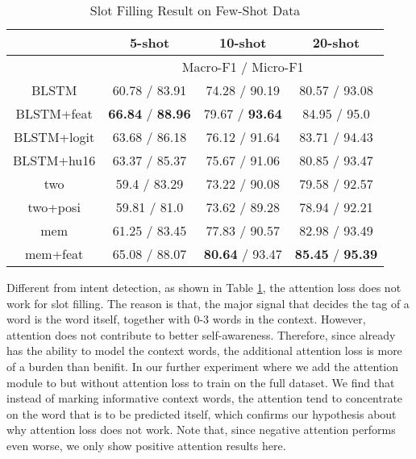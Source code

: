 \begin{table}
\setlength{\tabcolsep}{0.23em}
\centering
\small{
\begin{tabular}{|c|c|c|c|}

\hline
  & \multicolumn{1}{|c|}{5-shot} & \multicolumn{1}{|c|}{10-shot} & \multicolumn{1}{|c|}{20-shot}  \\
 \hline
  &  \multicolumn{3}{|c|}{Macro-F1 / Micro-F1}   \\
\hline
BLSTM & 60.78 / 83.91 & 74.28  / 90.19 & 80.57 / 93.08 \\
\hline
BLSTM+feat & \textbf{66.84} / \textbf{88.96} & 79.67 / \textbf{93.64} & 84.95 / 95.0 \\
\hline
BLSTM+logit & 63.68 / 86.18 & 76.12 / 91.64  & 83.71 / 94.43 \\
\hline
BLSTM+hu16 & 63.37 / 85.37 & 75.67 / 91.06 & 80.85 / 93.47 \\
\hline
two & 59.4 / 83.29 & 73.22 / 90.08 & 79.58 / 92.57 \\
\hline
two+posi & 59.81 / 81.0 & 73.62 / 89.28 & 78.94 / 92.21 \\
\hline
mem & 61.25 / 83.45 & 77.83 / 90.57 & 82.98 / 93.49 \\
\hline
mem+feat & 65.08 / 88.07 & \textbf{80.64} / 93.47 & \textbf{85.45} / \textbf{95.39} \\
\hline
\end{tabular}
}
\caption{Slot Filling Result on Few-Shot Data}
\label{tab_slot_few}
\end{table}

Different from intent detection, as shown in Table \ref{tab_slot_few}, the attention loss does not work for slot filling.
The reason is that, the major signal that decides the tag of a word is the word itself, together with 0-3 words in the context.
However, attention does not contribute to better self-awareness. 
Therefore, since \BLSTM already has the ability to model the context words, the additional attention loss is more of a burden than benifit.
In our further experiment where we add the attention module to \BLSTM but without attention loss to train on the full dataset. 
We find that instead of marking informative context words, the attention tend to concentrate on the word that is to be predicted itself, which confirms our hypothesis about why attention loss does not work. 
Note that, since negative attention performs even worse, we only show positive attention results here.

